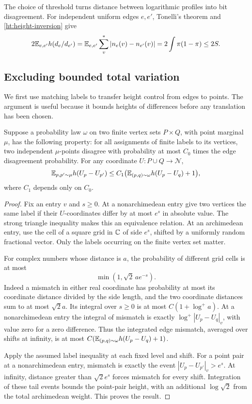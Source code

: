 The choice of threshold turns distance between logarithmic profiles into
bit disagreement. For independent uniform edges $e,e'$, Tonelli's theorem
and \eqref{ht:height-inversion} give
\begin{equation}\label{ht:independent-profiles}
 2\mathbb E_{e,e'}h(d_e/d_{e'})
 =\mathbb E_{e,e'}\sum_v^*|n_e(v)-n_{e'}(v)|
 =2\int\pi(1-\pi)\le2S.
\end{equation}

\subsection{Excluding bounded total variation}

We first use matching labels to transfer height control from edges to
points. The argument is useful because it bounds heights of differences
before any translation has been chosen.

\begin{lemma}\label{ht:transfer}
Suppose a probability law $\omega$ on two finite vertex sets $P\times Q$,
with point marginal $\mu$, has the following property: for all assignments of finite
labels to its vertices, two independent $\mu$-points disagree with
probability at most $C_0$ times the edge disagreement probability.
For any coordinate $U:P\cup Q\to\mathcal N$,
\[
 \mathbb E_{p,p'\sim\mu}h(U_p-U_{p'})
   \le C_1\bigl(\mathbb E_{(p,q)\sim\omega}h(U_p-U_q)+1\bigr),
\]
where $C_1$ depends only on $C_0$.
\end{lemma}

\begin{proof}
Fix an entry $v$ and $s\ge0$. At a nonarchimedean entry give two vertices
the same label if their $U$-coordinates differ by at most $e^s$ in
absolute value. The strong triangle inequality makes this an equivalence
relation. At an archimedean entry, use the cell of a square grid in
$\mathbb C$ of side $e^s$, shifted by a uniformly random fractional vector.
Only the labels occurring on the finite vertex set matter.

For complex numbers whose distance is $a$, the probability of different
grid cells is at most
\[
 \min(1,\sqrt2\,a e^{-s}).
\]
Indeed a mismatch in either real coordinate has probability at most its
coordinate distance divided by the side length, and the two coordinate
distances sum to at most $\sqrt2 a$. Its integral over $s\ge0$ is at most
$C(1+\log^+ a)$. At a nonarchimedean entry the integral of mismatch is
exactly $\log^+|U_p-U_q|_v$, with value zero for a zero difference.
Thus the integrated edge mismatch, averaged over shifts at infinity,
is at most $C(\mathbb E_{(p,q)\sim\omega}h(U_p-U_q)+1)$.

Apply the assumed label inequality at each fixed level and shift.
For a point pair at a nonarchimedean entry, mismatch is exactly the
event $|U_p-U_{p'}|_v>e^s$. At infinity, distance greater than
$\sqrt2 e^s$ forces mismatch for every shift. Integration of these
tail events bounds the point-pair height, with an additional
$\log\sqrt2$ from the total archimedean weight. This proves the result.
\end{proof}

